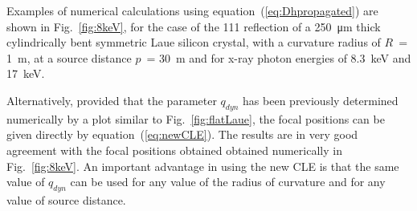 \documentclass[preprint]{iucr}              %
\newcommand{\inred}[1]{{\color{red}#1}}
\begin{document}
Examples of numerical calculations \inred{using equation~(\ref{eq:Dhpropagated})} are shown in Fig.~\ref{fig:8keV}, for the case of the 111 reflection of a \SI{250}{\micro\meter} thick cylindrically bent symmetric Laue silicon crystal, with a curvature radius of $R$~= \SI{1}{\meter}, at a source distance $p$~= \SI{30}{\meter} and for x-ray photon energies of 8.3~keV and 17~keV. 

\inred{Alternatively, provided that the parameter $q_{dyn}$ has been previously determined numerically by a plot similar to Fig.~\ref{fig:flatLaue}, the focal positions can be given directly by equation~(\ref{eq:newCLE}). The results are in very good agreement with the focal positions obtained obtained numerically in Fig.~\ref{fig:8keV}. An important advantage in using the new CLE is that the same value of $q_{dyn}$ can be used for any value of the radius of curvature and for any value of source distance. 
}
\end{document}
